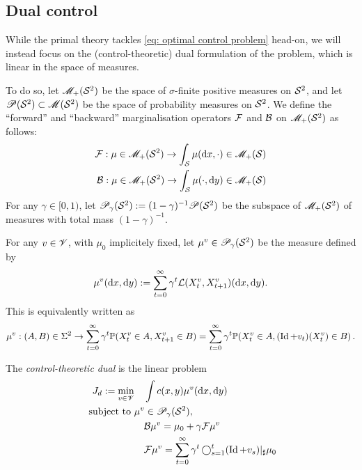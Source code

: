\documentclass[twoside,10pt]{../jmlr}
\begin{document}
\subsection{Dual control}

While the primal theory  tackles \eqref{eq: optimal control problem} head-on, we will instead focus on the (control-theoretic) dual formulation of the problem, which is linear in the space of measures.


To do so, let $\mathscr{M}_+(\mathcal{S}^2)$ be the space of $\sigma$-finite positive measures on $\mathcal{S}^2$, and let $\mathscr{P}(\mathcal{S}^2)\subset \mathscr{M}(\mathcal{S}^2)$ be the space of probability measures on $\mathcal{S}^2$.  We define the ``forward'' and ``backward'' marginalisation operators $\mathcal{F}$ and $\mathcal{B}$ on $\mathscr{M}_+(\mathcal{S}^2)$ as follows:
\begin{align}
\mathcal{F}: \mu\in\mathscr{M}_+(\mathcal{S}^2)\to \int_{\mathcal{S}} \mu(\mathrm{d} x,\cdot)\in \mathscr{M}_+(\mathcal{S})\\
\mathcal{B}: \mu\in\mathscr{M}_+(\mathcal{S}^2)\to \int_{\mathcal{S}} \mu(\cdot,\mathrm{d} y)\in \mathscr{M}_+(\mathcal{S})
\end{align}
For any $\gamma\in[0,1)$, let $\mathscr{P}_\gamma(\mathcal{S}^2):=(1-\gamma)^{-1}\mathscr{P}(\mathcal{S}^2)$ be the subspace of $\mathscr{M}_+(\mathcal{S}^2)$ of measures with total mass $(1-\gamma)^{-1}$.

For any $v\in\mathscr{V}$, with $\mu_0$ implicitely fixed, let $\mu^v\in\mathscr{P}_\gamma(\mathcal{S}^2)$ be the measure defined by 
\begin{align}
    \mu^v(\mathrm{d} x,\mathrm{d} y):=\sum_{t=0}^{\infty} \gamma^t \mathcal{L}(X_t^v,X_{t+1}^v)(\mathrm{d} x,\mathrm{d} y).
\end{align}
This is equivalently written as \begin{align}
    \mu^v: (A,B)\in\Sigma^2\to \sum_{t=0}^{\infty} \gamma^t \mathbb{P}(X_t^v\in A, X_{t+1}^v\in B) = \sum_{t=0}^{\infty} \gamma^t \mathbb{P}(X_t^v\in A,(\operatorname{Id}+v_t)(X_t^v)\in B)\,.
\end{align}


The \emph{control-theoretic dual} is the linear problem
\begin{align}
\dualvalue:=\min_{\control\in\controlspace} &\quad \int c(x,y)\mu^\control(\de x,\de y) \label{eq: dual control problem}\\
\mbox{ subject to }& \mu^\control\in\Ps_\gamma(\statespace^2),\notag\\
&\quad \bop\mu^\control=\mu_0 + \gamma \fop \mu^\control \\ %
&\quad  \fop\mu^\control= \sum_{t=0}^{\infty} \gamma^t \bigcomp_{s=1}^t(\Id+\velocity_s)\pushforward \mu_0 \notag
\end{align}
\end{document}
